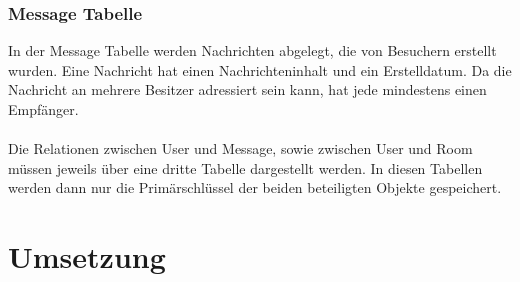 \subsubsection{Message Tabelle}\label{Message Tabelle}
In der Message Tabelle werden Nachrichten abgelegt, die von Besuchern erstellt wurden. Eine Nachricht hat einen Nachrichteninhalt und ein Erstelldatum. Da die Nachricht an mehrere Besitzer adressiert sein kann, hat jede mindestens einen Empfänger.
\\
\\
Die Relationen zwischen User und Message, sowie zwischen User und Room müssen jeweils über eine dritte Tabelle dargestellt werden. In diesen Tabellen werden dann nur die Primärschlüssel der beiden beteiligten Objekte gespeichert.






















\section{Umsetzung}\label{Umsetzung}
